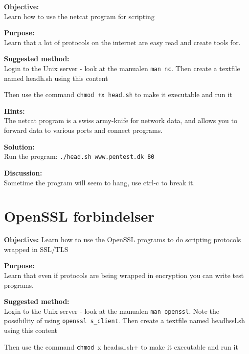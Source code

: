 \documentclass[a4paper,11pt,notitlepage]{report}
\begin{document}
{\bf Objective:} \\
Learn how to use the netcat program for scripting

{\bf Purpose:}\\
Learn that a lot of protocols on the internet are easy read and create tools for.

{\bf Suggested method:} \\
Login to the Unix server - look at the manualen \verb+man nc+.
Then create a textfile named headh.sh using this content
\begin{alltt}

\end{alltt}

Then use the command \verb#chmod +x head.sh# to make it executable and run it

{\bf Hints:}\\
The netcat program is a swiss army-knife for network data, and allows you to forward data to various ports and connect programs.

{\bf Solution:}\\
Run the program: \verb+./head.sh www.pentest.dk 80+


{\bf Discussion:}\\

Sometime the program will seem to hang, use ctrl-c to break it.

\chapter{OpenSSL forbindelser}
\label{ex:openssl}

{\bf Objective:}
Learn how to use the OpenSSL programs to do scripting protocols wrapped in SSL/TLS

{\bf Purpose:}\\
Learn that even if protocols are being wrapped in encryption you can write test programs.

{\bf Suggested method:} \\
Login to the Unix server - look at the manualen \verb+man openssl+. Note the possibility
of using \verb+openssl s_client+.
Then create a textfile named headhssl.sh using this content

\begin{alltt}

\end{alltt}

Then use the command \verb+chmod +x headssl.sh+ to make it executable and run it
\end{document}

